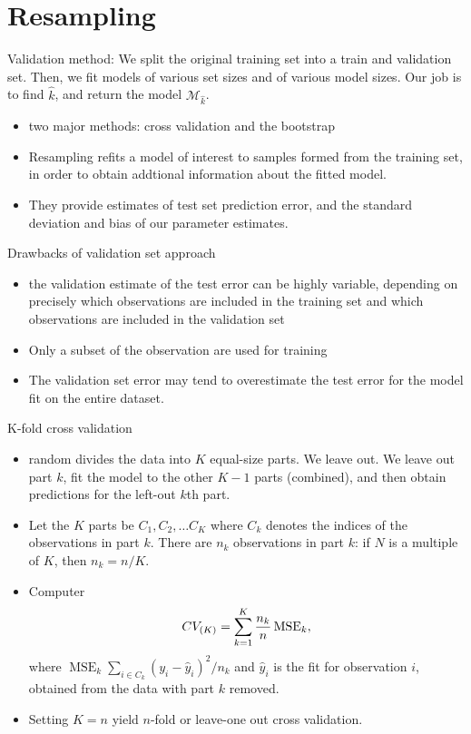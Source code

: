\documentclass[11pt, a4paper]{article}
\begin{document}
\section{Resampling}
Validation method: We split the original training set into a train and validation set. Then, we fit models of various set sizes and of various model sizes. Our job is to find $\hat{k}$, and return the model $\mathcal{M}_{\hat{k}}$.
\begin{itemize}
  \item two major methods: cross validation and the bootstrap
  \item Resampling refits a model of interest to samples formed from the training set, in order to obtain addtional information about the fitted model.
  \item They provide estimates of test set prediction error, and the standard deviation and bias of our parameter estimates.
  \end{itemize}
Drawbacks of validation set approach
\begin{itemize}
\item the validation estimate of the test error can be highly variable, depending on precisely which observations are included in the training set and which observations are included in the validation set
\item Only a subset of the observation are used for training
\item The validation set error may tend to overestimate the test error for the model fit on the entire dataset. 
\end{itemize}
K-fold cross validation
\begin{itemize}
\item random divides the data into $K$ equal-size parts. We leave out. We leave out part $k$, fit the model to the other $K-1$ parts (combined), and then obtain predictions for the left-out $k$th part.
\item Let the $K$ parts be $C_1,C_2,\dots C_K$ where $C_k$ denotes the indices of the observations in part $k$. There are $n_k$ observations in part $k$: if $N$ is a multiple of $K$, then $n_k=n/K$.
\item Computer
  \[
    CV_{(K)}=\sum_{k=1}^K{n_k\over n}\operatorname{MSE}_k,
  \]
  where $\operatorname{MSE}_k\sum_{i\in C_k}(y_i-\hat{y}_i)^2/n_k$ and $\hat{y}_i$ is the fit for observation $i$, obtained from the data with part $k$ removed.
\item Setting $K=n$ yield $n$-fold or leave-one out cross validation.
\end{itemize}
\end{document}
